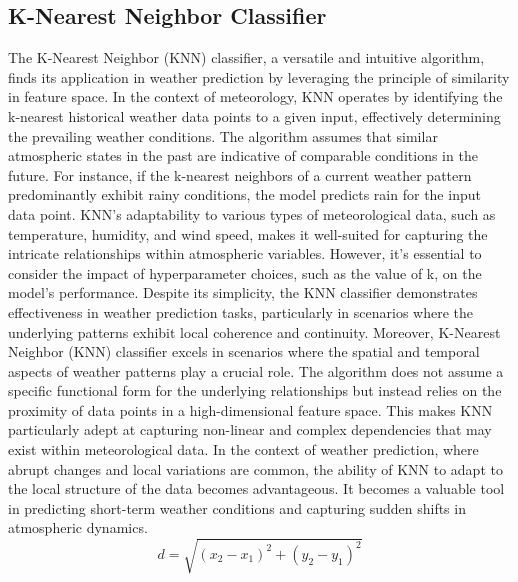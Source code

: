 \documentclass[conference, onecolumn]{IEEEtran}
\begin{document}
\subsection{\textbf{K-Nearest Neighbor Classifier}}
The K-Nearest Neighbor (KNN) classifier, a versatile and intuitive algorithm, finds its application in weather prediction by leveraging the principle of similarity in feature space. In the context of meteorology, KNN operates by identifying the k-nearest historical weather data points to a given input, effectively determining the prevailing weather conditions. The algorithm assumes that similar atmospheric states in the past are indicative of comparable conditions in the future. For instance, if the k-nearest neighbors of a current weather pattern predominantly exhibit rainy conditions, the model predicts rain for the input data point. KNN's adaptability to various types of meteorological data, such as temperature, humidity, and wind speed, makes it well-suited for capturing the intricate relationships within atmospheric variables. However, it's essential to consider the impact of hyperparameter choices, such as the value of k, on the model's performance. Despite its simplicity, the KNN classifier demonstrates effectiveness in weather prediction tasks, particularly in scenarios where the underlying patterns exhibit local coherence and continuity. Moreover, K-Nearest Neighbor (KNN) classifier excels in scenarios where the spatial and temporal aspects of weather patterns play a crucial role. The algorithm does not assume a specific functional form for the underlying relationships but instead relies on the proximity of data points in a high-dimensional feature space. This makes KNN particularly adept at capturing non-linear and complex dependencies that may exist within meteorological data. In the context of weather prediction, where abrupt changes and local variations are common, the ability of KNN to adapt to the local structure of the data becomes advantageous. It becomes a valuable tool in predicting short-term weather conditions and capturing sudden shifts in atmospheric dynamics.
\indent\indent \[ d = \sqrt{(x_2 - x_1)^2 + (y_2 - y_1)^2} \]
\end{document}

